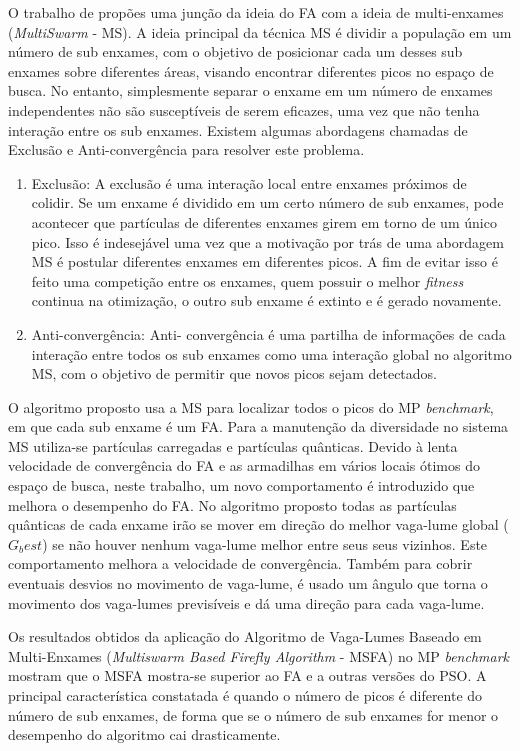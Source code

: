 O trabalho de \cite{farahani2011multiswarm} propões uma junção da ideia do FA com a ideia de multi-enxames (\textit{MultiSwarm} - MS). A ideia principal da técnica MS é dividir a população em um número de sub enxames, com o objetivo de posicionar cada um desses sub enxames sobre diferentes áreas, visando encontrar diferentes picos no espaço de busca. No entanto, simplesmente separar o enxame em um número de enxames independentes não são susceptíveis de serem eficazes, uma vez que não tenha interação entre os sub enxames. Existem algumas abordagens chamadas de Exclusão e Anti-convergência para resolver este problema.

\begin{enumerate}
\item Exclusão: A exclusão é uma interação local entre enxames próximos de colidir. Se um enxame é dividido em um certo número de sub enxames, pode acontecer que partículas de diferentes enxames girem em torno de um único pico. Isso é indesejável uma vez que a motivação por trás de uma abordagem MS é postular diferentes enxames em diferentes picos. A fim de evitar isso é feito uma competição entre os enxames, quem possuir o melhor \textit{fitness} continua na otimização, o outro sub enxame é extinto e é gerado novamente.

\item Anti-convergência: Anti- convergência é uma partilha de informações de cada interação entre todos os sub enxames como uma interação global no algoritmo MS, com o objetivo de permitir que novos picos sejam detectados.
\end{enumerate}

O algoritmo proposto usa a MS para localizar todos o picos do MP \textit{benchmark}, em que cada sub enxame é um FA. Para a manutenção da diversidade no sistema MS utiliza-se partículas carregadas e partículas quânticas. Devido à lenta velocidade de convergência do FA e as armadilhas em vários locais ótimos do espaço de busca, neste trabalho, um novo comportamento é introduzido que melhora o desempenho do FA. No algoritmo proposto todas as partículas quânticas de cada enxame irão se mover em direção do melhor vaga-lume global ($G_best$) se não houver nenhum vaga-lume melhor entre seus seus vizinhos. Este comportamento melhora a velocidade de convergência. Também para cobrir eventuais desvios no movimento de vaga-lume, é usado um ângulo que torna o movimento dos vaga-lumes previsíveis e dá uma direção para cada vaga-lume.

Os resultados obtidos da aplicação do Algoritmo de Vaga-Lumes Baseado em Multi-Enxames (\textit{Multiswarm Based Firefly Algorithm} - MSFA) no MP \textit{benchmark} mostram que o MSFA mostra-se superior ao FA e a outras versões do PSO. A principal característica constatada é quando o número de picos é diferente do número de sub enxames, de forma que se o número de sub enxames for menor o desempenho do algoritmo cai drasticamente.

